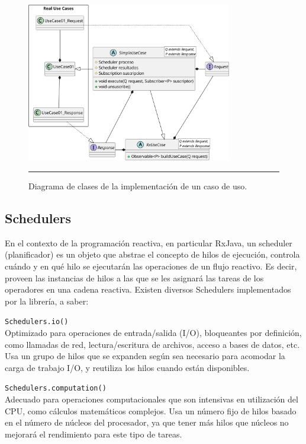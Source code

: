 \begin{figure}[htbp]
	\centering
	\includegraphics[width=0.8\textwidth]{Figures/iter1/CLASS_use_cases.png}
	\rule{35em}{1pt}
	\caption[Class Diagram]{Diagrama de clases de la implementación de un caso de uso.}
	\label{fig:class_usecases}
\end{figure}

\subsection{Schedulers}
En el contexto de la programación reactiva, en particular RxJava, un scheduler (planificador) es un objeto que abstrae el concepto de hilos de ejecución, controla cuándo y en qué hilo se ejecutarán las operaciones de un flujo reactivo. Es decir, proveen las instancias de hilos a las que se les asignará las tareas de los operadores en una cadena reactiva. Existen diversos Schedulers implementados por la librería, a saber:

\texttt{Schedulers.io()}\\
Optimizado para operaciones de entrada/salida (I/O), bloqueantes por definición, como llamadas de red, lectura/escritura de archivos, acceso a bases de datos, etc.
Usa un grupo de hilos que se expanden según sea necesario para acomodar la carga de trabajo I/O, y reutiliza los hilos cuando están disponibles.

\texttt{Schedulers.computation()}\\
Adecuado para operaciones computacionales que son intensivas en utilización del CPU, como cálculos matemáticos complejos.
Usa un número fijo de hilos basado en el número de núcleos del procesador, ya que tener más hilos que núcleos no mejorará el rendimiento para este tipo de tareas.

